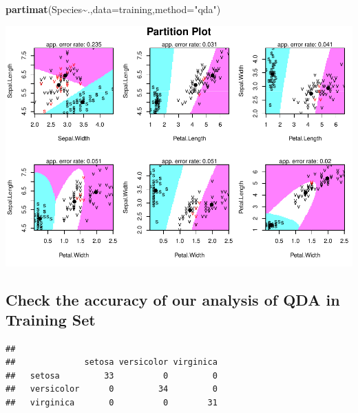\documentclass[
]{article}
\newenvironment{Shaded}{\begin{snugshade}}{\end{snugshade}}
\newcommand{\AttributeTok}[1]{\textcolor[rgb]{0.13,0.29,0.53}{#1}}
\newcommand{\CommentTok}[1]{\textcolor[rgb]{0.56,0.35,0.01}{\textit{#1}}}
\newcommand{\FunctionTok}[1]{\textcolor[rgb]{0.13,0.29,0.53}{\textbf{#1}}}
\newcommand{\NormalTok}[1]{#1}
\newcommand{\OtherTok}[1]{\textcolor[rgb]{0.56,0.35,0.01}{#1}}
\newcommand{\SpecialCharTok}[1]{\textcolor[rgb]{0.81,0.36,0.00}{\textbf{#1}}}
\newcommand{\StringTok}[1]{\textcolor[rgb]{0.31,0.60,0.02}{#1}}
\begin{document}
\begin{Shaded}
\begin{Highlighting}[]
\FunctionTok{partimat}\NormalTok{(Species}\SpecialCharTok{\textasciitilde{}}\NormalTok{.,}\AttributeTok{data=}\NormalTok{training,}\AttributeTok{method=}\StringTok{"qda"}\NormalTok{)}
\end{Highlighting}
\end{Shaded}

\includegraphics{LDA_QDA_IRIS_files/figure-latex/unnamed-chunk-6-2.pdf}

\hypertarget{check-the-accuracy-of-our-analysis-of-qda-in-training-set}{%
\subsection{Check the accuracy of our analysis of QDA in Training
Set}\label{check-the-accuracy-of-our-analysis-of-qda-in-training-set}}

\begin{Shaded}
\end{Shaded}

\begin{verbatim}
##             
##              setosa versicolor virginica
##   setosa         33          0         0
##   versicolor      0         34         0
##   virginica       0          0        31
\end{verbatim}
\end{document}
